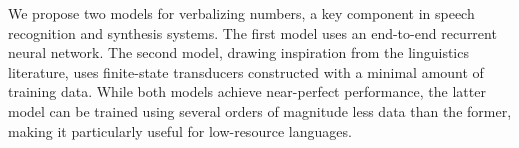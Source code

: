 We propose two models for verbalizing numbers, a key component in speech recognition and synthesis systems. The first model uses an end-to-end recurrent neural network. The second model, drawing inspiration from the linguistics literature, uses finite-state transducers constructed with a minimal amount of training data. While both models achieve near-perfect performance, the latter model can be trained using several orders of magnitude less data than the former, making it particularly useful for low-resource languages.
